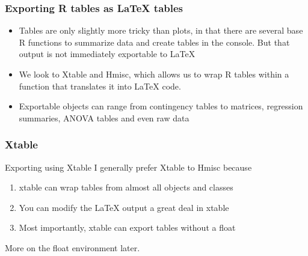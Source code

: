 \documentclass[nogin]{beamer}\usepackage[]{graphicx}\usepackage[]{color}
\begin{document}
\begin{frame}[fragile]
\frametitle{Exporting R tables as LaTeX tables }
\begin{itemize}
\item Tables are only slightly more tricky than plots, in that there are several base R functions to summarize data and create tables in the console. But that output is not immediately exportable to LaTeX
\item We look to Xtable and Hmisc, which allows us to wrap R tables within a function that translates it into LaTeX code.
\item Exportable objects can range from contingency tables to matrices, regression summaries, ANOVA tables and even raw data
\end{itemize}
\end{frame}

\begin{frame}
\frametitle{Xtable}
\begin{block}{Exporting using Xtable}
I generally prefer Xtable to Hmisc because
\begin{enumerate}
\item xtable can wrap tables from almost all objects and classes
\item You can modify the LaTeX output a great deal in xtable
\item Most importantly, xtable can export tables without a float
\end{enumerate}
More on the float environment later.
\end{block}
\end{frame}
\end{document}
